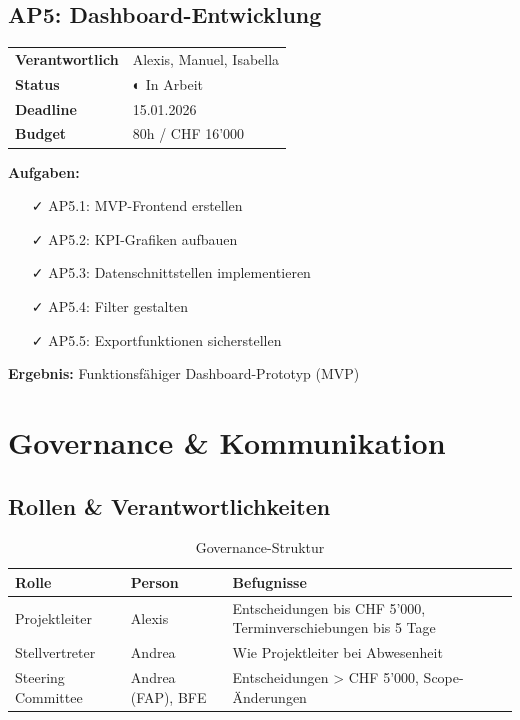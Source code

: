 \documentclass[11pt,a4paper]{article}
\begin{document}
\subsection{AP5: Dashboard-Entwicklung}

\begin{table}[h]
\centering
\begin{tabular}{L{4cm}L{8cm}}
\toprule
\textbf{Verantwortlich} & Alexis, Manuel, Isabella \\
\textbf{Status} & \textcolor{faorange}{◐ In Arbeit} \\
\textbf{Deadline} & 15.01.2026 \\
\textbf{Budget} & 80h / CHF 16'000 \\
\bottomrule
\end{tabular}
\end{table}

\textbf{Aufgaben:}
\begin{itemize}[leftmargin=*]
    \item[✓] AP5.1: MVP-Frontend erstellen
    \item[✓] AP5.2: KPI-Grafiken aufbauen
    \item[✓] AP5.3: Datenschnittstellen implementieren
    \item[✓] AP5.4: Filter gestalten
    \item[✓] AP5.5: Exportfunktionen sicherstellen
\end{itemize}

\textbf{Ergebnis:} Funktionsfähiger Dashboard-Prototyp (MVP)

\newpage

\section{Governance \& Kommunikation}

\subsection{Rollen \& Verantwortlichkeiten}

\begin{table}[h]
\centering
{}
\begin{tabular}{L{3.5cm}L{4cm}L{5cm}}
\toprule
\textbf{Rolle} & \textbf{Person} & \textbf{Befugnisse} \\
\midrule
Projektleiter & Alexis & Entscheidungen bis CHF 5'000, Terminverschiebungen bis 5 Tage \\
Stellvertreter & Andrea & Wie Projektleiter bei Abwesenheit \\
Steering Committee & Andrea (FAP), BFE & Entscheidungen > CHF 5'000, Scope-Änderungen \\
\bottomrule
\end{tabular}
\caption{Governance-Struktur}
\end{table}
\end{document}

